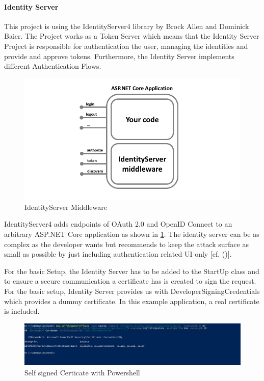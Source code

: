 \paragraph{Identity Server}

This project is using the IdentityServer4 library by Brock Allen and Dominick Baier. The Project works as a Token Server which means that the Identity Server Project is responsible for authentication the user, managing the identities and provide and approve tokens. Furthermore, the Identity Server implements different Authentication Flows.


\begin{figure}[h]
	\centering
	\includegraphics[width=0.8\linewidth]{images/middlewareIdentityServer}
	\caption{IdentityServer Middleware}
	\label{fig:middlewareidentityserver}
\end{figure}
 

IdentityServer4 adds endpoints of OAuth 2.0 and OpenID Connect to an arbitrary ASP.NET Core application as shown in \ref{fig:middlewareidentityserver}. The identity server can be as complex as the developer wants but \cite{Brock:2018:ID4} recommends to keep the attack surface as small as possible by just including authentication related UI only [cf. (\cite{Brock:2018:ID4})]. 


For the basic Setup, the Identity Server has to be added to the StartUp class and to ensure a secure communication a certificate has is created to sign the request. For the basic setup, Identity Server provides us with DeveloperSigningCredentials which provides a dummy certificate. In this example application, a real certificate is included. 

\begin{figure}[h]
	\centering
	\includegraphics[width=0.8\linewidth]{images/self-signed-certicate}
	\caption{Self signed Certicate with Powershell}
	\label{fig:self-signed-certicate}
\end{figure}

